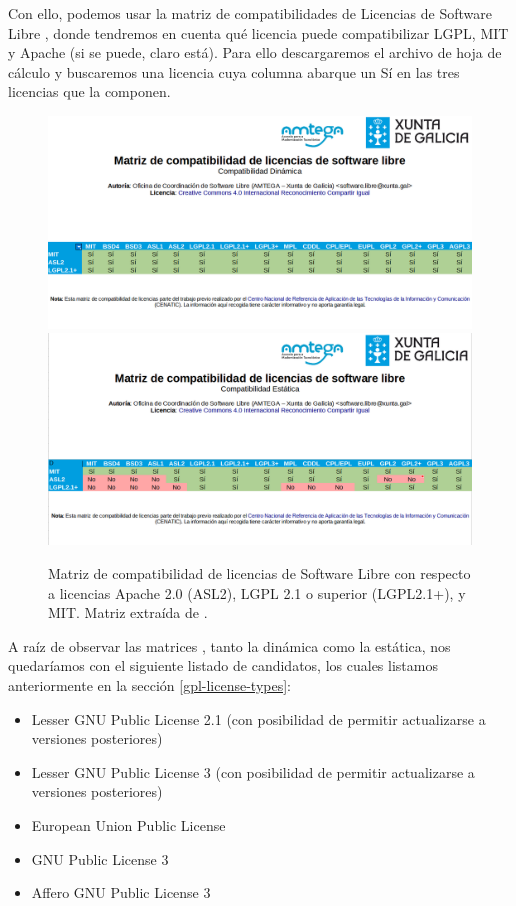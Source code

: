 Con ello, podemos usar la matriz de compatibilidades de Licencias de Software Libre \cite{matriz-licencias}, donde tendremos en cuenta qué licencia puede compatibilizar LGPL, MIT y Apache (si se puede, claro está). Para ello descargaremos el archivo de hoja de cálculo y buscaremos una licencia cuya columna abarque un Sí en las tres licencias que la componen.

\begin{center}
	\begin{figure}[H]
		\includegraphics[width=\textwidth]{imagenes/MatrizCompatibilidadDinamica.png}
		\includegraphics[width=\textwidth]{imagenes/MatrizCompatibilidadEstatica.png}
		\caption{Matriz de compatibilidad de licencias de Software Libre con respecto a licencias Apache 2.0 (ASL2), LGPL 2.1 o superior (LGPL2.1+), y MIT. Matriz extraída de \cite{matriz-licencias}.}
	\end{figure}
\end{center}

A raíz de observar las matrices , tanto la dinámica como la estática, nos quedaríamos con el siguiente listado de candidatos, los cuales listamos anteriormente en la sección \ref{gpl-license-types}:
\begin{itemize}
	\item Lesser GNU Public License 2.1 (con posibilidad de permitir actualizarse a versiones posteriores)
	\item Lesser GNU Public License 3 (con posibilidad de permitir actualizarse a versiones posteriores)
	\item European Union Public License
	\item GNU Public License 3
	\item Affero GNU Public License 3
\end{itemize}

